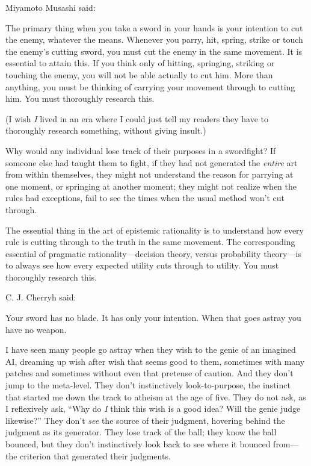 {
 Miyamoto Musashi said:}

{
 The primary thing when you take a sword in your hands is your
intention to cut the enemy, whatever the means. Whenever you parry,
hit, spring, strike or touch the enemy's cutting sword,
you must cut the enemy in the same movement. It is essential to attain
this. If you think only of hitting, springing, striking or touching the
enemy, you will not be able actually to cut him. More than anything,
you must be thinking of carrying your movement through to cutting him.
You must thoroughly research this.}

{
 (I wish \textit{I} lived in an era where I could just tell my
readers they have to thoroughly research something, without giving
insult.)}

{
 Why would any individual lose track of their purposes in a
swordfight? If someone else had taught them to fight, if they had not
generated the \textit{entire} art from within themselves, they might
not understand the reason for parrying at one moment, or springing at
another moment; they might not realize when the rules had exceptions,
fail to see the times when the usual method won't cut
through.}

{
 The essential thing in the art of epistemic rationality is to
understand how every rule is cutting through to the truth in the same
movement. The corresponding essential of pragmatic
rationality---decision theory, versus probability theory---is to always
see how every expected utility cuts through to utility. You must
thoroughly research this.}

{
 C. J. Cherryh said:}

{
 Your sword has no blade. It has only your intention. When that
goes astray you have no weapon.}

{
 I have seen many people go astray when they wish to the genie of
an imagined AI, dreaming up wish after wish that seems good to them,
sometimes with many patches and sometimes without even that pretense of
caution. And they don't jump to the meta-level. They
don't instinctively look-to-purpose, the instinct that
started me down the track to atheism at the age of five. They do not
ask, as I reflexively ask, ``Why do \textit{I} think
this wish is a good idea? Will the genie judge
likewise?'' They don't \textit{see}
the source of their judgment, hovering behind the judgment as its
generator. They lose track of the ball; they know the ball bounced, but
they don't instinctively look back to see where it
bounced from---the criterion that generated their judgments.}

